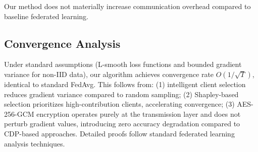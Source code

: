 Our method does not materially increase communication overhead compared to baseline federated learning.

\subsection{Convergence Analysis}

Under standard assumptions (L-smooth loss functions and bounded gradient variance for non-IID data), our algorithm achieves convergence rate $O(1/\sqrt{T})$, identical to standard FedAvg. This follows from: (1) intelligent client selection reduces gradient variance compared to random sampling; (2) Shapley-based selection prioritizes high-contribution clients, accelerating convergence; (3) AES-256-GCM encryption operates purely at the transmission layer and does not perturb gradient values, introducing zero accuracy degradation compared to CDP-based approaches. Detailed proofs follow standard federated learning analysis techniques.
